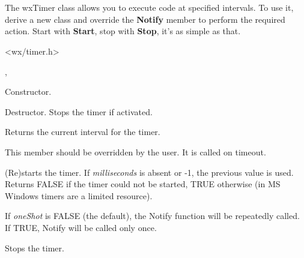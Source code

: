 \section{}\label{wxtimer}

The wxTimer class allows you to execute code at specified intervals. To
use it, derive a new class and override the {\bf Notify} member to
perform the required action. Start with {\bf Start}, stop with {\bf
Stop}, it's as simple as that.




<wx/timer.h>


, 




Constructor.



Destructor. Stops the timer if activated.



Returns the current interval for the timer.



This member should be overridden by the user. It is called on timeout.



(Re)starts the timer. If {\it milliseconds}\/ is absent or -1, the
previous value is used. Returns FALSE if the timer could not be started,
TRUE otherwise (in MS Windows timers are a limited resource).

If {\it oneShot} is FALSE (the default), the Notify function will be repeatedly
called. If TRUE, Notify will be called only once.



Stops the timer.



